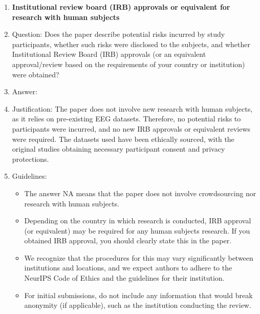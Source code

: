 \documentclass{article}
\begin{document}
\begin{enumerate}
\item {\bf Institutional review board (IRB) approvals or equivalent for research with human subjects}
    \item[] Question: Does the paper describe potential risks incurred by study participants, whether such risks were disclosed to the subjects, and whether Institutional Review Board (IRB) approvals (or an equivalent approval/review based on the requirements of your country or institution) were obtained?
    \item[] Answer: \answerNA{} %
    \item[] Justification: The paper does not involve new research with human subjects, as it relies on pre-existing EEG datasets. Therefore, no potential risks to participants were incurred, and no new IRB approvals or equivalent reviews were required. The datasets used have been ethically sourced, with the original studies obtaining necessary participant consent and privacy protections.
    \item[] Guidelines:
    \begin{itemize}
        \item The answer NA means that the paper does not involve crowdsourcing nor research with human subjects.
        \item Depending on the country in which research is conducted, IRB approval (or equivalent) may be required for any human subjects research. If you obtained IRB approval, you should clearly state this in the paper. 
        \item We recognize that the procedures for this may vary significantly between institutions and locations, and we expect authors to adhere to the NeurIPS Code of Ethics and the guidelines for their institution. 
        \item For initial submissions, do not include any information that would break anonymity (if applicable), such as the institution conducting the review.
    \end{itemize}


\end{enumerate}
\end{document}
